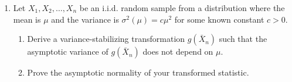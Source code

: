 \documentclass[12pt]{article}%
\begin{document}
\begin{enumerate}[leftmargin=*]

   \item Let $X_1, X_2, \dots, X_n$ be an i.i.d. random sample from a
      distribution where the mean is $\mu$ and the variance is $\sigma^2(\mu) =
      c\mu^2$ for some known constant $c > 0$. 
      \begin{enumerate}
         \item[(a)] Derive a variance-stabilizing transformation $g(\bar{X}_n)$
            such that the asymptotic variance of $g(\bar{X}_n)$ does not depend
            on $\mu$. 
         \item[(b)] Prove the asymptotic normality of your transformed statistic.
      \end{enumerate}


\end{enumerate}
\end{document}
